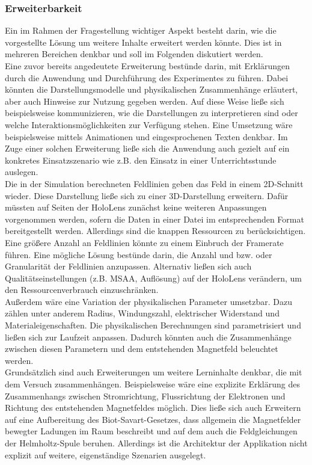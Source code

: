 \subsubsection{Erweiterbarkeit}
Ein im Rahmen der Fragestellung wichtiger Aspekt besteht darin, wie die vorgestellte Lösung um weitere Inhalte erweitert werden könnte. Dies ist in mehreren Bereichen denkbar und soll im Folgenden diskutiert werden.\\

Eine zuvor bereits angedeutete Erweiterung bestünde darin, mit Erklärungen durch die Anwendung und Durchführung des Experimentes zu führen. Dabei könnten die Darstellungsmodelle und physikalischen Zusammenhänge erläutert, aber auch Hinweise zur Nutzung gegeben werden. Auf diese Weise ließe sich beispielsweise kommunizieren, wie die Darstellungen zu interpretieren sind oder welche Interaktionsmöglichkeiten zur Verfügung stehen. Eine Umsetzung wäre beispielsweise mittels Animationen und eingesprochenen Texten denkbar. Im Zuge einer solchen Erweiterung ließe sich die Anwendung auch gezielt auf ein konkretes Einsatzszenario wie z.B. den Einsatz in einer Unterrichtsstunde auslegen.\\

Die in der Simulation berechneten Feldlinien geben das Feld in einem 2D-Schnitt wieder. Diese Darstellung ließe sich zu einer 3D-Darstellung erweitern. Dafür müssten auf Seiten der HoloLens zunächst keine weiteren Anpassungen vorgenommen werden, sofern die Daten in einer Datei im entsprechenden Format bereitgestellt werden. Allerdings sind die knappen Ressourcen zu berücksichtigen. Eine größere Anzahl an Feldlinien könnte zu einem Einbruch der Framerate führen. Eine mögliche Lösung bestünde darin, die Anzahl und bzw. oder Granularität der Feldlinien anzupassen. Alternativ ließen sich auch Qualitätseinstellungen (z.B. MSAA, Auflösung) auf der HoloLens verändern, um den Ressourcenverbrauch einzuschränken.\\

Außerdem wäre eine Variation der physikalischen Parameter umsetzbar. Dazu zählen unter anderem Radius, Windungszahl, elektrischer Widerstand und Materialeigenschaften. Die physikalischen Berechnungen sind parametrisiert und ließen sich zur Laufzeit anpassen. Dadurch könnten auch die Zusammenhänge zwischen diesen Parametern und dem entstehenden Magnetfeld beleuchtet werden.\\

Grundsätzlich sind auch Erweiterungen um weitere Lerninhalte denkbar, die mit dem Versuch zusammenhängen. Beispielsweise wäre eine explizite Erklärung des Zusammenhangs zwischen Stromrichtung, Flussrichtung der Elektronen und Richtung des entstehenden Magnetfeldes möglich. Dies ließe sich auch Erweitern auf eine Aufbereitung des Biot-Savart-Gesetzes, dass allgemein die Magnetfelder bewegter Ladungen im Raum beschreibt und auf dem auch die Feldgleichungen der Helmholtz-Spule beruhen. Allerdings ist die Architektur der Applikation nicht explizit auf weitere, eigenständige Szenarien ausgelegt.\\

